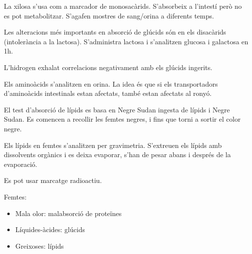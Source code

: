 La xilosa s'usa com a marcador de monosacàrids. S'absorbeix  a l'intestí però no es pot metabolitzar. S'agafen mostres de sang/orina a diferents temps.

Les alteracions més importants en absorció de glúcids són en els disacàrids (intolerància a la lactosa). S'administra lactosa i s'analitzen glucosa i galactosa en 1h.

L'hidrogen exhalat correlacions negativament amb els glúcids ingerits.

Els aminoàcids s'analitzen en orina. La idea és que si els transportadors d'aminoàcids intestinals estan afectats, també estan afectats al ronyó.

El test d'absorció de lípids es basa en Negre Sudan ingesta de lípids i Negre Sudan. Es comencen a recollir les femtes negres, i fins que torni a sortir el color negre.

Els lípids en femtes s'analitzen per gravimetria. S'extreuen els lípids amb dissolvents orgànics i es deixa evaporar, s'han de pesar abans i després de la evaporació.

Es pot usar marcatge radioactiu.

Femtes:
\begin{itemize}
\item Mala olor: malabsorció de proteïnes
\item Líquides-àcides: glúcids
\item Greixoses: lípids
\end{itemize}